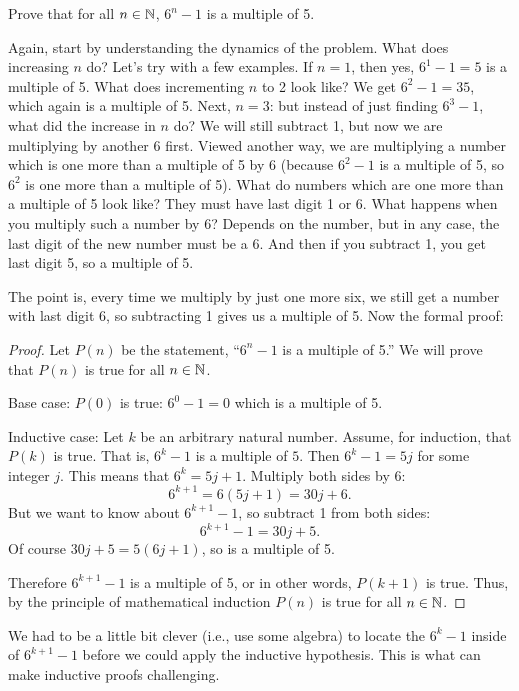 \documentclass[12pt]{article}
\begin{document}
 \begin{example}
   Prove that for all $n \in \mathbb N$, $6^n - 1$ is a multiple of 5.
   \begin{solution}
   Again, start by understanding the dynamics of the problem.  What does increasing $n$ do?  Let's try with a few examples.  If $n = 1$, then yes, $6^1 - 1 = 5$ is a multiple of 5.  What does incrementing $n$ to 2 look like?  We get $6^2 - 1 = 35$, which again is a multiple of 5.  Next, $n = 3$: but instead of just finding $6^3 - 1$, what did the increase in $n$ do?  We will still subtract 1, but now we are multiplying by another 6 first.  Viewed another way, we are multiplying a number which is one more than a multiple of 5 by 6 (because $6^2 - 1$ is a multiple of 5, so $6^2$ is one more than a multiple of 5).  What do numbers which are one more than a multiple of 5 look like?  They must have last digit 1 or 6.  What happens when you multiply such a number by 6?  Depends on the number, but in any case, the last digit of the new number must be a 6.  And then if you subtract 1, you get last digit 5, so a multiple of 5.  
   
   The point is, every time we multiply by just one more six, we still get a number with last digit 6, so subtracting 1 gives us a multiple of 5. Now the formal proof:
   
   \begin{proof}
     Let $P(n)$ be the statement, ``$6^n - 1$ is a multiple of 5.''  We will prove that $P(n)$ is true for all $n \in \mathbb N$.
     
     Base case: $P(0)$ is true: $6^0 -1 = 0$ which is a multiple of 5.
     
     Inductive case: Let $k$ be an arbitrary natural number.  Assume, for induction, that $P(k)$ is true.  That is, $6^k - 1$ is a multiple of $5$.  Then $6^k - 1 = 5j$ for some integer $j$.  This means that $6^k = 5j + 1$.  Multiply both sides by $6$: 
     \[6^{k+1} = 6(5j+1) = 30j + 6.\]
     But we want to know about $6^{k+1} - 1$, so subtract 1 from both sides:
     \[6^{k+1} - 1 = 30j + 5.\]
     Of course $30j+5 = 5(6j+1)$, so is a multiple of 5.

     Therefore $6^{k+1} - 1$ is a multiple of 5, or in other words, $P(k+1)$ is true.  Thus, by the principle of mathematical induction $P(n)$ is true for all $n \in \mathbb N$.
   \end{proof}
   \end{solution}
 \end{example}

We had to be a little bit clever (i.e., use some algebra) to locate the $6^k - 1$ inside of $6^{k+1} - 1$ before we could apply the inductive hypothesis.  This is what can make inductive proofs challenging.  
\end{document}
